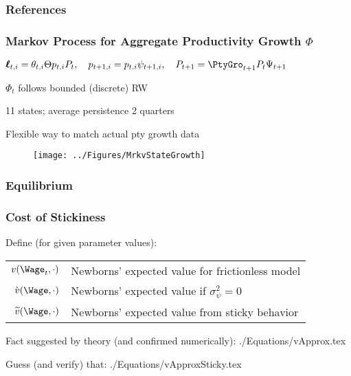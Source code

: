 \documentclass{beamer}\usepackage{dcolumn}
\providecommand{\perc}[1]{\widetilde{#1}}
\providecommand{\econtexRoot}{.}
\providecommand{\eq}{\econtexRoot/Equations}
\begin{document}
\begin{frame}[t,allowframebreaks]
\frametitle{References}


\end{frame}

\normalsize



\begin{frame}
  \frametitle{Markov Process for Aggregate Productivity Growth $\Phi$}

$
\pmb{\ell}_{t,i} = \theta_{t,i}\Theta p_{t,i} {P}_{t},\quad
p_{t+1,i} =  {{p}}_{t,i} \psi_{t+1,i},  \quad
 {P}_{t+1} =  \PtyGro_{t+1} {P}_{t}\Psi_{t+1}
$
\bi
\item $\Phi_t$ follows bounded (discrete) RW
\item 11 states; average persistence 2 quarters
\item Flexible way to match actual pty growth data
\ei
  \begin{figure}
\begin{center}
\texttt{[image: ../Figures/MrkvStateGrowth]}
\end{center}
\end{figure}

\end{frame}



\begin{frame}
\frametitle{Equilibrium}

\footnotesize


\end{frame}


\begin{frame}
\frametitle{Cost of Stickiness}
Define (for given parameter values):
\begin{center}
\begin{tabular}{rl}
${v}(\Wage_t,\cdot)$ & Newborns' expected value for frictionless model
\\ $\grave{v}(\Wage,\cdot)$ & Newborns' expected value if $\sigma^{2}_{\psi}=0$
\\ $\perc{v}(\Wage,\cdot)$ & Newborns' expected value from sticky behavior
\end{tabular}
\end{center}

Fact suggested by theory (and confirmed numerically):
 \eq/vApprox.tex

Guess (and verify) that:
 \eq/vApproxSticky.tex


\end{frame}
\end{document}
